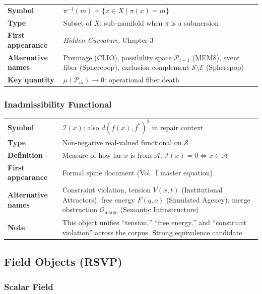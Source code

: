 \documentclass[11pt, a4paper]{article}
\begin{document}
\begin{longtable}{lp{10cm}}
\textbf{Symbol} & $\pi^{-1}(m) = \{x \in X \mid \pi(x) = m\}$ \\
\textbf{Type} & Subset of $X$; sub-manifold when $\pi$ is a submersion \\
\textbf{First appearance} & \textit{Hidden Curvature}, Chapter 3 \\
\textbf{Alternative names} & Preimage (CLIO), possibility space
  $\mathcal{P}_{i-1}$ (MEM\textbar{}8), event fiber (Spherepop),
  exclusion complement $\mathcal{S} \setminus \mathcal{E}$ (Spherepop) \\
\textbf{Key quantity} & $\mu(\mathcal{P}_m) \to 0$: operational fiber death \\
\end{longtable}

\subsubsection{Inadmissibility Functional}

\begin{longtable}{lp{10cm}}
\textbf{Symbol} & $\mathcal{I}(x)$; also $d(f(x), f^*)^2$ in repair context \\
\textbf{Type} & Non-negative real-valued functional on $\mathcal{S}$ \\
\textbf{Definition} & Measure of how far $x$ is from $\mathcal{A}$;
  $\mathcal{I}(x) = 0 \iff x \in \mathcal{A}$ \\
\textbf{First appearance} & Formal spine document (Vol.~I master equation) \\
\textbf{Alternative names} & Constraint violation, tension $V(x,t)$
  (Institutional Attractors), free energy $F(q,o)$ (Simulated Agency),
  merge obstruction $\mathcal{O}_\mathrm{merge}$ (Semantic Infrastructure) \\
\textbf{Note} & This object unifies ``tension,'' ``free energy,'' and
  ``constraint violation'' across the corpus. Strong equivalence candidate. \\
\end{longtable}

\subsection{Field Objects (RSVP)}

\subsubsection{Scalar Field}
\end{document}
